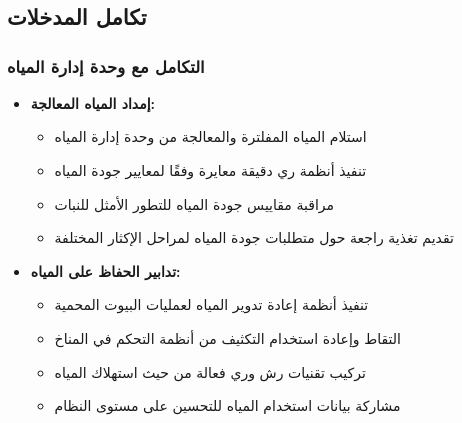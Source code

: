 \section{}

\subsection{}

\subsection{تكامل المدخلات}

\subsubsection{التكامل مع وحدة إدارة المياه}
\begin{itemize}
    \item \textbf{إمداد المياه المعالجة:}
    \begin{itemize}
        \item استلام المياه المفلترة والمعالجة من وحدة إدارة المياه
        \item تنفيذ أنظمة ري دقيقة معايرة وفقًا لمعايير جودة المياه
        \item مراقبة مقاييس جودة المياه للتطور الأمثل للنبات
        \item تقديم تغذية راجعة حول متطلبات جودة المياه لمراحل الإكثار المختلفة
    \end{itemize}
    
    \item \textbf{تدابير الحفاظ على المياه:}
    \begin{itemize}
        \item تنفيذ أنظمة إعادة تدوير المياه لعمليات البيوت المحمية
        \item التقاط وإعادة استخدام التكثيف من أنظمة التحكم في المناخ
        \item تركيب تقنيات رش وري فعالة من حيث استهلاك المياه
        \item مشاركة بيانات استخدام المياه للتحسين على مستوى النظام
    \end{itemize}
\end{itemize}

